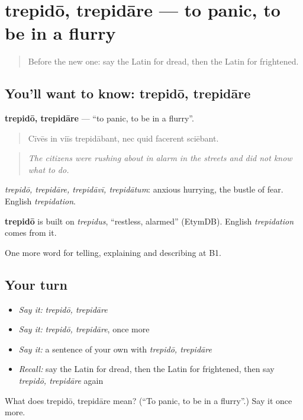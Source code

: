 \section[trepidō, trepidāre]{trepidō, trepidāre — to panic, to be in a flurry}

\label{lesson:LA-C320-trepido}



\begin{quote}
Before the new one: say the Latin for dread, then the Latin for frightened.
\end{quote}

\subsection*{You'll want to know: trepidō, trepidāre}
\textbf{trepidō, trepidāre} — \textquotedblleft{}to panic, to be in a flurry\textquotedblright{}.

\begin{quote}
Cīvēs in viīs trepidābant, nec quid facerent sciēbant.
\end{quote}

\begin{quote}
\emph{The citizens were rushing about in alarm in the streets and did not know what to do.}
\end{quote}

\emph{trepidō, trepidāre, trepidāvī, trepidātum}: anxious hurrying, the bustle of fear. English \emph{trepidation}.

\begin{cousinweb}
\textbf{trepidō} is built on \emph{trepidus}, \textquotedblleft{}restless, alarmed\textquotedblright{} (EtymDB). English \emph{trepidation} comes from it.
\end{cousinweb}

\begin{grammarlens}[title={What you've built}]
One more word for telling, explaining and describing at B1.
\end{grammarlens}

\subsection*{Your turn}
\begin{itemize}
\raggedright
  \item \emph{Say it:} \emph{trepidō, trepidāre}
  \item \emph{Say it:} \emph{trepidō, trepidāre}, once more
  \item \emph{Say it:} a sentence of your own with \emph{trepidō, trepidāre}
  \item \emph{Recall:} say the Latin for dread, then the Latin for frightened, then say \emph{trepidō, trepidāre} again
\end{itemize}

\begin{tcolorbox}[breakable,colback=teal!4,colframe=teal!35!black,title={Before you move on}]
What does trepidō, trepidāre mean? (\textquotedblleft{}To panic, to be in a flurry\textquotedblright{}.) Say it once more.
\end{tcolorbox}
